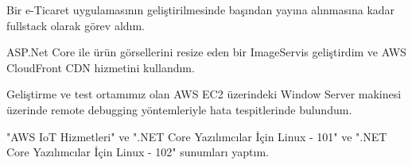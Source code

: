\begin{cventries}
        {
            \begin{cvitems}
                \item { Bir e-Ticaret uygulamasının geliştirilmesinde başından yayına alınmasına kadar fullstack olarak  görev aldım. }
                \item { ASP.Net Core ile ürün görsellerini resize eden bir ImageServis geliştirdim ve AWS CloudFront CDN hizmetini kullandım. }
                \item { Geliştirme ve test ortamımız olan AWS EC2 üzerindeki Window Server makinesi üzerinde remote debugging yöntemleriyle hata tespitlerinde bulundum. }
                \item { "AWS IoT Hizmetleri" ve ".NET Core Yazılımcılar İçin Linux - 101" ve ".NET Core Yazılımcılar İçin Linux - 102" sunumları yaptım. }
            \end{cvitems}
        }
        
\end{cventries}
